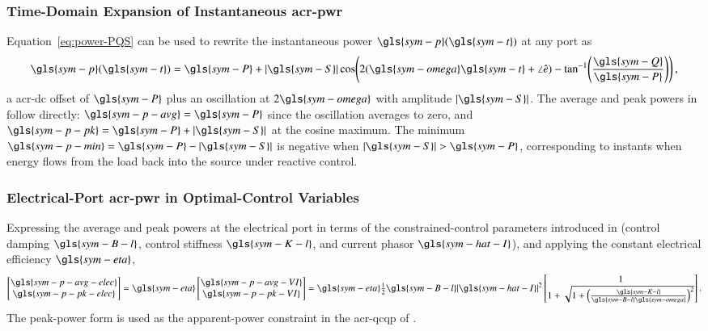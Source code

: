 
\subsubsection{Time-Domain Expansion of Instantaneous \gls{acr-pwr}}
\label{sec:appendix-power-time}

Equation~\eqref{eq:power-PQS} can be used to rewrite the instantaneous power $\gls{sym-p}(\gls{sym-t})$ at any port as \citep{saadat_power_1999}
\begin{equation}\label{eq:power-time-PQS}
    \gls{sym-p}(\gls{sym-t}) =
    \gls{sym-P} + |\gls{sym-S}|
    \cos\!\left(
                2(\gls{sym-omega} \gls{sym-t} + \angle\hat{e})
                - \tan^{-1}\!\left(
                                    \frac{\gls{sym-Q}} {\gls{sym-P}}
                            \right)
        \right),
\end{equation}
a \gls{acr-dc} offset of $\gls{sym-P}$ plus an oscillation at $2\gls{sym-omega}$ with amplitude $|\gls{sym-S}|$.
The average and peak powers in  follow directly:
$\gls{sym-p-avg} = \gls{sym-P}$ since the oscillation averages to zero,
and $\gls{sym-p-pk} = \gls{sym-P} + |\gls{sym-S}|$ at the cosine maximum.
The minimum $\gls{sym-p-min} = \gls{sym-P} - |\gls{sym-S}|$ is negative when $|\gls{sym-S}|>\gls{sym-P}$,
corresponding to instants when energy flows from the load back into the source under reactive control.

\subsubsection{Electrical-Port \gls{acr-pwr} in Optimal-Control Variables}
\label{sec:appendix-power-elec}

Expressing the average and peak powers at the electrical port in terms of the constrained-control parameters introduced in 
(control damping $\gls{sym-B-l}$, control stiffness $\gls{sym-K-l}$, and current phasor $\gls{sym-hat-I}$),
and applying the constant electrical efficiency $\gls{sym-eta}$,
\begin{equation}\label{eq:power-elec}
    \begin{bmatrix}
        \gls{sym-p-avg-elec} \\
        \gls{sym-p-pk-elec}
    \end{bmatrix}
    =
    \gls{sym-eta}
    \begin{bmatrix}
        \gls{sym-p-avg-VI} \\
        \gls{sym-p-pk-VI}
    \end{bmatrix}
    =
    \gls{sym-eta} \tfrac{1}{2} \gls{sym-B-l} |\gls{sym-hat-I}|^2
    \begin{bmatrix}
        1 \\
        1 + \sqrt{1 + \left(
                        \tfrac{\gls{sym-K-l}} {\gls{sym-B-l}\gls{sym-omega}}
                    \right)^2}
    \end{bmatrix}.
\end{equation}
The peak-power form is used as the apparent-power constraint in the \gls{acr-qcqp} of .

